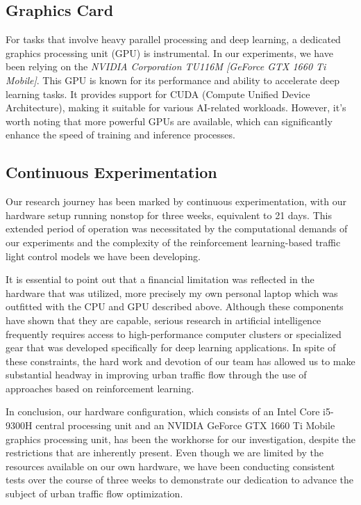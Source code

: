 \subsection{Graphics Card}

For tasks that involve heavy parallel processing and deep learning, a dedicated graphics processing unit (GPU) is instrumental. In our experiments, we have been relying on the \textit{NVIDIA Corporation TU116M [GeForce GTX 1660 Ti Mobile]}. This GPU is known for its performance and ability to accelerate deep learning tasks. It provides support for CUDA (Compute Unified Device Architecture), making it suitable for various AI-related workloads. However, it's worth noting that more powerful GPUs are available, which can significantly enhance the speed of training and inference processes.

\subsection{Continuous Experimentation}

Our research journey has been marked by continuous experimentation, with our hardware setup running nonstop for three weeks, equivalent to 21 days. This extended period of operation was necessitated by the computational demands of our experiments and the complexity of the reinforcement learning-based traffic light control models we have been developing. 

It is essential to point out that a financial limitation was reflected in the hardware that was utilized, more precisely my own personal laptop which was outfitted with the CPU and GPU described above. Although these components have shown that they are capable, serious research in artificial intelligence frequently requires access to high-performance computer clusters or specialized gear that was developed specifically for deep learning applications. In spite of these constraints, the hard work and devotion of our team has allowed us to make substantial headway in improving urban traffic flow through the use of approaches based on reinforcement learning.

In conclusion, our hardware configuration, which consists of an Intel Core i5-9300H central processing unit and an NVIDIA GeForce GTX 1660 Ti Mobile graphics processing unit, has been the workhorse for our investigation, despite the restrictions that are inherently present. Even though we are limited by the resources available on our own hardware, we have been conducting consistent tests over the course of three weeks to demonstrate our dedication to advance the subject of urban traffic flow optimization.